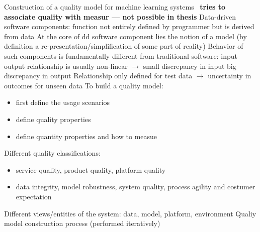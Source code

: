 Construction of a quality model for machine learning systems~\cite{siebert_construction_2021}
\textbf{tries to associate quality with measur --- not  possible in thesis}
Data-driven software components: function not entirely defined by programmer but is derived from data
At the core of dd software component lies the notion of a model (by definition a
re-presentation/simplification of some part of reality)
Behavior of such components is fundamentally different from traditional software: input-output
relationship is usually non-linear $\rightarrow$ small discrepancy in input big discrepancy in output
Relationship only defined for test data $\rightarrow$ uncertainty in outcomes for unseen data
To build a quality model:
\begin{itemize}
    \item first define the usage scenarios
    \item define quality properties
    \item define quantity properties and how to measue
\end{itemize}
Different quality classifications:
\begin{itemize}
    \item service quality, product quality, platform quality
    \item  data integrity, model robustness, system quality, process agility and costumer expectation
\end{itemize}
Different views/entities of the system: data, model, platform, environment
Qualiy model construction process (performed iteratively)
